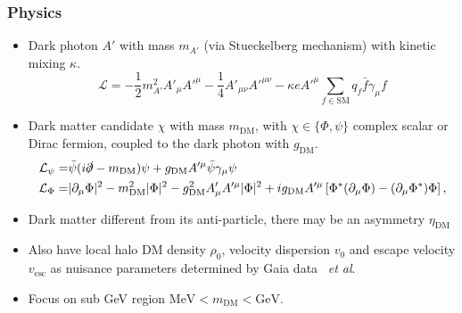 \documentclass[aspectratio=169]{beamer}
\begin{document}
\begin{frame}
    \frametitle{Physics}
    \begin{itemize}
        \item Dark photon $A'$ with mass $\boxed{m_{A'}}$ (via Stueckelberg mechanism) with kinetic mixing $\boxed{\kappa}$.
            \[\mathcal{L} = -\frac{1}{2}m_{A'}^2 A'_\mu A'^\mu - \frac{1}{4}A'_{\mu\nu}A'^{\mu\nu} - \kappa e A'^\mu \sum_{f\in\text{SM}} q_f \bar f \gamma_\mu f\]
        \item Dark matter candidate $\chi$ with mass $\boxed{m_\text{DM}}$, with $\chi\in\{\Phi, \psi\}$ complex scalar or Dirac fermion, coupled to the dark photon with $\boxed{g_\text{DM}}$.
        \begin{align*}
            \mathcal{L}_\psi  =& \bar{\psi}(i \slashed{\partial} - m_\text{DM}) \psi + g_\text{DM} A'^\mu \bar{\psi} \gamma_\mu \psi \\
            \mathcal{L}_\Phi  =& |\partial_\mu \Phi|^2 - m_\text{DM}^2 |\Phi|^2 - g_\text{DM}^2 A'_\mu A'^\mu |\Phi|^2 + i g_\text{DM} A'^\mu \left[\Phi^\ast (\partial_\mu \Phi) - (\partial_\mu \Phi^\ast) \Phi\right],
        \end{align*}
    \item Dark matter different from its anti-particle, there may be an asymmetry $\boxed{\eta_\text{DM}}$
    \item Also have local halo DM density $\rho_0$, velocity dispersion $v_0$ and escape velocity $v_\text{esc}$ as nuisance parameters determined by Gaia data~ \textit{et al}.
    \item Focus on sub GeV region $\text{MeV} < m_\text{DM} < \text{GeV}$.
    \end{itemize}
\end{frame}
\end{document}
